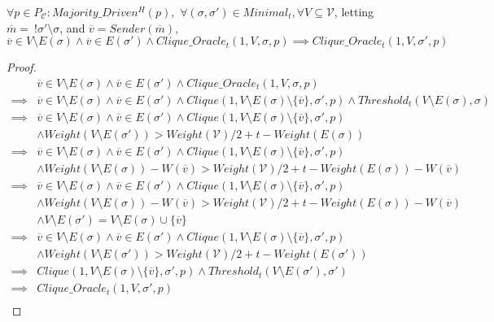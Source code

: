 \begin{lemma}
  $\forall p \in P_{\mathcal{C}} : Majority\_Driven^H(p),$ $\forall (\sigma, \sigma') \in Minimal_t, \forall V \subseteq \mathcal{V}$, letting $\overline{m} = ~ !\sigma'\setminus\sigma$, and $\overline{v} = Sender(\overline{m})$,
  $$
  \overline{v} \in V \setminus E(\sigma) \land \overline{v} \in E(\sigma') \land Clique\_Oracle_t(1, V, \sigma, p) \implies Clique\_Oracle_t(1, V, \sigma', p)
  $$
\end{lemma}

\begin{proof}
\begin{align}
          &\overline{v} \in V \setminus E(\sigma) \land \overline{v} \in E(\sigma') \land Clique\_Oracle_t(1, V, \sigma, p) \\
  \implies&\overline{v} \in V \setminus E(\sigma) \land \overline{v} \in E(\sigma') \land Clique(1, V \setminus E(\sigma) \setminus \{\overline{v}\}, \sigma', p) \land Threshold_t(V \setminus E(\sigma), \sigma) \\
  \implies&\overline{v} \in V \setminus E(\sigma) \land \overline{v} \in E(\sigma') \land Clique(1, V \setminus E(\sigma) \setminus \{\overline{v}\}, \sigma', p) \\
          &\land Weight(V \setminus E(\sigma')) > Weight(\mathcal{V})/2 + t - Weight(E(\sigma)) \\
  \implies&\overline{v} \in V \setminus E(\sigma) \land \overline{v} \in E(\sigma') \land Clique(1, V \setminus E(\sigma) \setminus \{\overline{v}\}, \sigma', p) \\
          &\land Weight(V \setminus E(\sigma)) - W(\overline{v}) > Weight(\mathcal{V})/2 + t - Weight(E(\sigma)) - W(\overline{v}) \\
  \implies&\overline{v} \in V \setminus E(\sigma) \land \overline{v} \in E(\sigma') \land Clique(1, V \setminus E(\sigma) \setminus \{\overline{v}\}, \sigma', p) \\
          &\land Weight(V \setminus E(\sigma)) - W(\overline{v}) > Weight(\mathcal{V})/2 + t - Weight(E(\sigma)) - W(\overline{v}) \\
          &\land V \setminus E(\sigma') = V \setminus E(\sigma) \cup \{\overline{v}\} \\
  \implies&\overline{v} \in V \setminus E(\sigma) \land \overline{v} \in E(\sigma') \land Clique(1, V \setminus E(\sigma) \setminus \{\overline{v}\}, \sigma', p) \\
          &\land Weight(V \setminus E(\sigma')) > Weight(\mathcal{V})/2 + t - Weight(E(\sigma')) \\
  \implies&Clique(1, V \setminus E(\sigma) \setminus \{\overline{v}\}, \sigma', p) \land Threshold_t(V \setminus E(\sigma'), \sigma') \\
  \implies&Clique\_Oracle_t(1, V, \sigma', p) \\
\end{align}
\end{proof}


